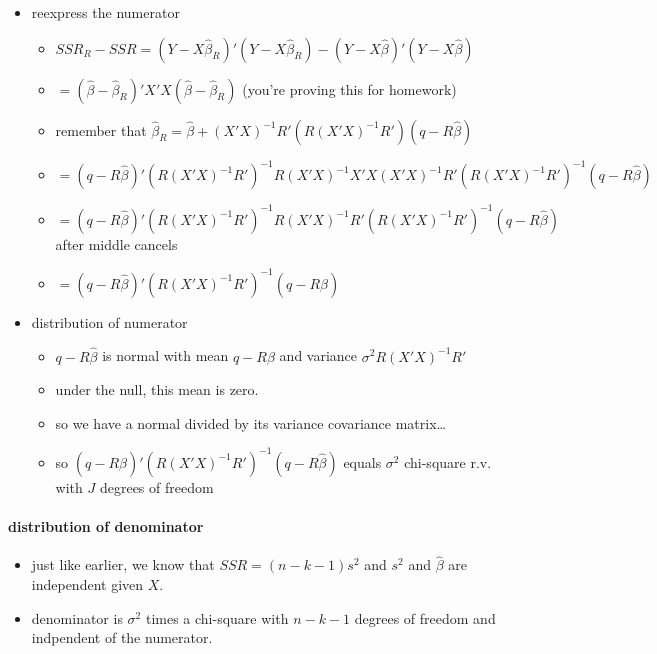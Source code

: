 \begin{itemize}
\item reexpress the numerator
\begin{itemize}
\item $SSR_R - SSR = (Y - X\hat\beta_R)'(Y - X\hat\beta_R) - (Y -
             X\hat\beta)'(Y - X\hat\beta)$
\item $= (\hat\beta - \hat\beta_R)'X'X(\hat\beta - \hat\beta_R)$
             (you're proving this for homework)
\item remember that $\hat\beta_R = \hat\beta + (X'X)^{-1}
             R'(R(X'X)^{-1}R')(q - R\hat\beta)$
\item $= (q -
             R\hat\beta)'(R(X'X)^{-1}R')^{-1}R(X'X)^{-1}X'X(X'X)^{-1}R'(R(X'X)^{-1}R')^{-1}
             (q - R\hat\beta)$
\item $= (q -
             R\hat\beta)'(R(X'X)^{-1}R')^{-1}R(X'X)^{-1} R'(R(X'X)^{-1}R')^{-1}
             (q - R\hat\beta)$ after middle cancels
\item $= (q -
             R\hat\beta)'(R(X'X)^{-1}R')^{-1}(q - R\hat\beta)$
\end{itemize}
\item distribution of numerator
\begin{itemize}
\item $q - R\hat\beta$ is normal with mean $q - R\beta$ and
             variance $\sigma^2 R(X'X)^{-1}R'$
\item under the null, this mean is zero.
\item so we have a normal divided by its variance covariance matrix\ldots{}
\item so $(q - R\hat\beta)'(R(X'X)^{-1}R')^{-1}(q - R\hat\beta)$
             equals $\sigma^2$ chi-square r.v. with $J$ degrees of freedom
\end{itemize}
\end{itemize}
\paragraph{distribution of denominator}
\label{sec-2-2-2-2}

\begin{itemize}
\item just like earlier, we know that $SSR = (n-k-1) s^2$ and $s^2$
         and $\hat \beta$ are independent given $X$.
\item denominator is $\sigma^2$ times a chi-square with $n-k-1$
         degrees of freedom and indpendent of the numerator.
\end{itemize}
